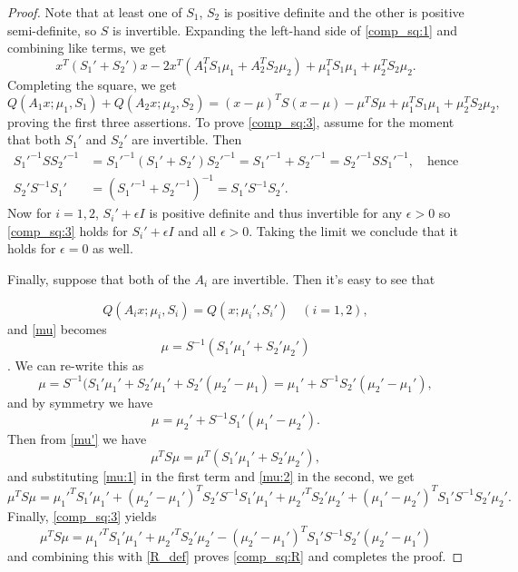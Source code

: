 \documentclass[12pt,leqno]{article}
\begin{document}
\begin{proof}
  Note that at least one of $S_1$, $S_2$ is positive definite and the other is positive semi-definite,
so $S$ is invertible.  Expanding the left-hand side of \eqref{comp_sq:1} and combining
like terms, we get
$$
x^T(S_1'+ S_2')x -2x^T(A_1^TS_1\mu_1+ A_2^TS_2\mu_2) 
+ \mu_1^TS_1\mu_1 + \mu_2^TS_2\mu_2.
$$
Completing the square, we get
$$
Q(A_1x;\mu_1,S_1) + Q(A_2x;\mu_2,S_2) = (x-\mu)^TS(x-\mu) -\mu^TS\mu + \mu_1^TS_1\mu_1 + \mu_2^TS_2\mu_2,
$$
proving the first three assertions.
To prove \eqref{comp_sq:3}, assume for the moment that both $S_1'$ and $S_2'$ are invertible.
Then
\begin{align*}
S_1'^{-1}SS_2'^{-1} &= S_1'^{-1}(S_1'+S_2')S_2'^{-1} = S_1'^{-1}+S_2'^{-1} = S_2'^{-1}SS_1'^{-1},\quad\text{hence}\\
S_2'S^{-1}S_1' &= (S_1'^{-1}+S_2'^{-1})^{-1} = S_1'S^{-1}S_2'.
\end{align*}
Now for $i = 1,2$, $S_i'+\epsilon{I}$ is positive definite and thus invertible for any $\epsilon > 0$
so \eqref{comp_sq:3} holds for $S_i'+\epsilon{I}$ and all $\epsilon > 0$.  Taking the limit
we conclude that it holds for $\epsilon = 0$ as well.

Finally, suppose that both of the $A_i$ are invertible. Then it's easy to see that

\begin{equation}\label{comp_sq:4}
Q(A_ix;\mu_i,S_i) = Q(x;\mu_i',S_i')\quad(i = 1,2),
\end{equation}
and \eqref{mu} becomes
\begin{equation} \label{mu'}
\mu = S^{-1}(S_1'\mu_1' + S_2'\mu_2')
\end{equation}.
We can re-write this as
\begin{equation}\label{mu:1}
\mu = S^{-1}(S_1'\mu_1' + S_2'\mu_1' + S_2'(\mu_2'-\mu_1) = \mu_1' + S^{-1}S_2'(\mu_2'-\mu_1'),
\end{equation}
and by symmetry we have
\begin{equation}\label{mu:2}
  \mu = \mu_2' + S^{-1}S_1'(\mu_1'-\mu_2').
\end{equation}
Then from \eqref{mu'} we have
$$
\mu^TS\mu = \mu^T(S_1'\mu_1' + S_2'\mu_2'),
$$
and substituting \eqref{mu:1} in the first term and \eqref{mu:2} in the second, we get
$$
\mu^TS\mu = \mu_1'^TS_1'\mu_1' + (\mu_2'-\mu_1')^TS_2'S^{-1}S_1'\mu_1' + \mu_2'^TS_2'\mu_2'+(\mu_1'-\mu_2')^TS_1'S^{-1}S_2'\mu_2'.
$$
Finally, \eqref{comp_sq:3} yields
$$
\mu^TS\mu = \mu_1'^TS_1'\mu_1' + \mu_2'^TS_2'\mu_2' - (\mu_2'-\mu_1')^TS_1'S^{-1}S_2'(\mu_2'-\mu_1')
$$
and combining this with \eqref{R_def} proves \eqref{comp_sq:R} and completes the proof.
\end{proof}
\end{document}
